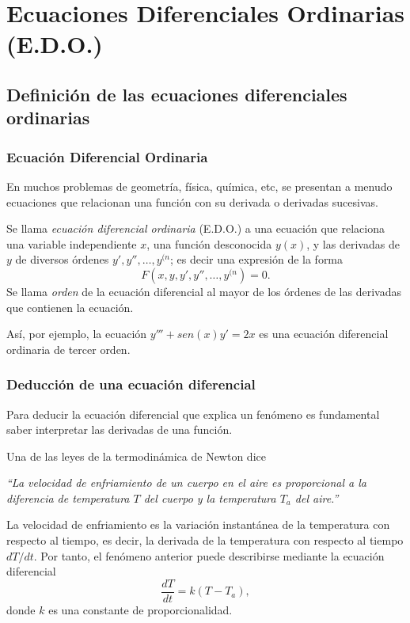 \section{Ecuaciones Diferenciales Ordinarias (E.D.O.)}



\subsection{Definición de las ecuaciones diferenciales ordinarias}
\begin{frame}
	\frametitle{Ecuación Diferencial Ordinaria}
	En muchos problemas de geometría, física, química, etc, se presentan a menudo ecuaciones que relacionan una función con su derivada o derivadas sucesivas.
		
	\begin{definicion}
		Se llama \emph{ecuación diferencial ordinaria} (E.D.O.) a una ecuación que relaciona
		una variable independiente $x$, una función desconocida $y(x)$, y las derivadas de $y$ de diversos órdenes $y',y'',\ldots,y^{(n}$; es decir una expresión de la forma
		\[
			F(x, y, y', y'',\ldots, y^{(n})=0.
		\] 
		Se llama \emph{orden} de la ecuación diferencial al mayor de los órdenes de las derivadas que contienen la ecuación.
	\end{definicion}
	Así, por ejemplo, la ecuación $y'''+sen(x)y'=2x$ es una ecuación diferencial ordinaria de tercer orden.
\end{frame}


\begin{frame}
	\frametitle{Deducción de una ecuación diferencial}
	Para deducir la ecuación diferencial que explica un fenómeno es fundamental saber interpretar las derivadas de una función.
		
	 Una de las leyes de la termodinámica de Newton dice
	\begin{center}
		\begin{minipage}{0.8\textwidth}
			\textit{``La velocidad de enfriamiento de un cuerpo en el aire es proporcional a la diferencia de temperatura $T$ del cuerpo y la temperatura $T_a$ del aire.''}
		\end{minipage}
	\end{center}
	La velocidad de enfriamiento es la variación instantánea de la temperatura con respecto al tiempo, es decir, la derivada de la temperatura con respecto al tiempo $dT/dt$.
	Por tanto, el fenómeno anterior puede describirse mediante la ecuación diferencial
	\[
		\frac{dT}{dt}=k(T-T_a),
	\]
	donde $k$ es una constante de proporcionalidad. 
\end{frame}



